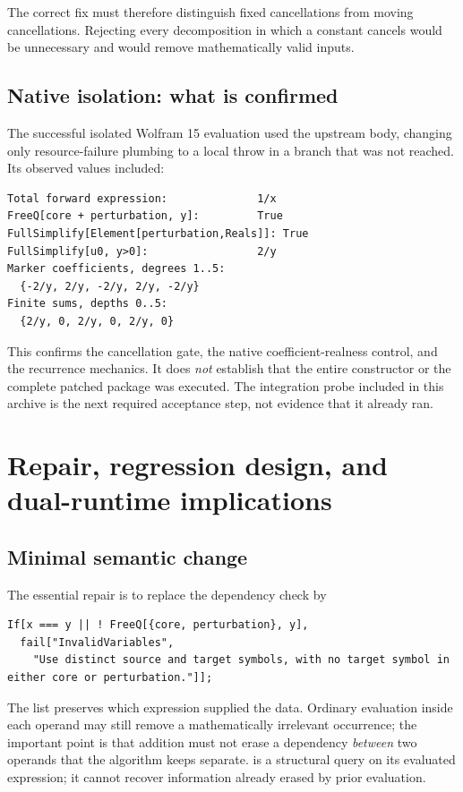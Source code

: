 \documentclass[11pt,a4paper]{article}
\theoremstyle{remark}\newtheorem{remark}[theorem]{Remark}
\newcommand{\code}[1]{\texttt{\detokenize{#1}}}
\begin{document}
The correct fix must therefore distinguish fixed cancellations from moving
cancellations. Rejecting every decomposition in which a constant cancels would
be unnecessary and would remove mathematically valid inputs.

\subsection{Native isolation: what is confirmed}

The successful isolated Wolfram 15 evaluation used the upstream
\code{corePerturbationTerm} body, changing only resource-failure plumbing to a
local throw in a branch that was not reached. Its observed values included:
\begin{lstlisting}
Total forward expression:              1/x
FreeQ[core + perturbation, y]:         True
FullSimplify[Element[perturbation,Reals]]: True
FullSimplify[u0, y>0]:                 2/y
Marker coefficients, degrees 1..5:
  {-2/y, 2/y, -2/y, 2/y, -2/y}
Finite sums, depths 0..5:
  {2/y, 0, 2/y, 0, 2/y, 0}
\end{lstlisting}
This confirms the cancellation gate, the native coefficient-realness control,
and the recurrence mechanics. It does \emph{not} establish that the entire
constructor or the complete patched package was executed. The integration probe
included in this archive is the next required acceptance step, not evidence
that it already ran.

\section{Repair, regression design, and dual-runtime implications}
\label{sec:repair}

\subsection{Minimal semantic change}

The essential repair is to replace the dependency check by
\begin{lstlisting}
If[x === y || ! FreeQ[{core, perturbation}, y],
  fail["InvalidVariables",
    "Use distinct source and target symbols, with no target symbol in either core or perturbation."]];
\end{lstlisting}
The list preserves which expression supplied the data. Ordinary evaluation
inside each operand may still remove a mathematically irrelevant occurrence;
the important point is that addition must not erase a dependency \emph{between}
two operands that the algorithm keeps separate. \code{FreeQ} is a structural
query on its evaluated expression; it cannot recover information already erased
by prior evaluation.\cite{freeq}
\end{document}
